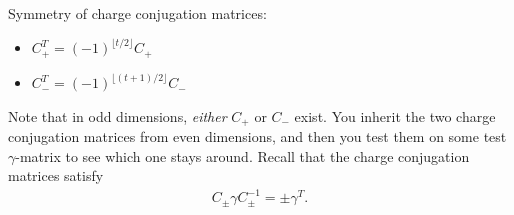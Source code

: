 \documentclass[11pt]{article}
\begin{document}
Symmetry of charge conjugation matrices:
\begin{itemize}
    \item $C_+^T = (-1)^{\lfloor t/2 \rfloor} C_+$
    \item $C_-^T = (-1)^{\lfloor (t + 1)/2 \rfloor} C_-$
\end{itemize}
Note that in odd dimensions, \emph{either} $C_+$ or $C_-$ exist.
You inherit the two charge conjugation matrices from even dimensions, and then
you test them on some test $\gamma$-matrix to see which one stays around.
Recall that the charge conjugation matrices satisfy
\begin{align*}
    \boxed{C_{\pm} \gamma C_{\pm}^{-1} = \pm \gamma^T.}
\end{align*}


\end{document}
